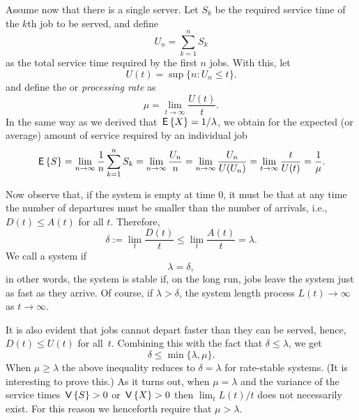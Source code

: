 Assume now that there is a single server. Let $S_k$ be the required
service time of the $k$th job to be served, and define
\begin{equation*}
U_n = \sum_{k=1}^n S_k
\end{equation*}
as the total service time required by the first $n$ jobs. With this,
let 
\begin{equation*}
  U(t) = \sup\{n: U_n \leq t\}.
\end{equation*}
and  define the  or \emph{processing rate} as
\begin{equation*}
  \mu = \lim_{t\to\infty} \frac{U(t)}t.
\end{equation*}
In the same way as we derived that $\,\mathsf{E}\left\{X\right\}= 1/\lambda$, we obtain for
the expected (or average) amount of service required by an individual
job
\begin{equation*}
  \,\mathsf{E}\left\{S\right\} = \lim_{n\to\infty} \frac 1 n \sum_{k=1}^n S_k = \lim_{n\to\infty} \frac{U_n}{n} = \lim_{n\to\infty} \frac{U_n}{U(U_n)} = \lim_{t\to\infty} \frac t{U(t)} = \frac 1 \mu.
\end{equation*}

Now observe that, if the system is empty at time $0$, it must be that
at any time the number of departures must be smaller than the number
of arrivals, i.e., $D(t) \leq A(t)$ for all $t$. Therefore,
\begin{equation}\label{eq:26}
\delta :=   \lim_t \frac{D(t)}t \leq \lim_t \frac{A(t)}t = \lambda.
\end{equation}
We call a system  if
\begin{equation*}
  \lambda = \delta,
\end{equation*}
in other words, the system is stable if, on the long run, jobs leave
the system just as fast as they arrive. Of course, if
$\lambda > \delta$, the system length process $L(t) \to \infty$ as
$t\to \infty$.

It is also evident that jobs cannot depart faster than they can be
served, hence, $D(t) \leq U(t)$ for all~$t$. Combining this with the
fact that $\delta \leq \lambda$, we get
\begin{equation*}
  \delta \leq \min\{\lambda, \mu\}.
\end{equation*}
When $\mu \geq \lambda$ the above inequality reduces to
$\delta = \lambda$ for rate-stable systems. (It is interesting to
prove this.) As it turns out, when $\mu = \lambda$ and the variance of
the service times $\,\mathsf{V}\left\{S\right\} > 0$ or $\,\mathsf{V}\left\{X\right\} >0$ then $\lim_t L(t)/t$
does not necessarily exist. For this reason we henceforth require that
$\mu > \lambda$.



